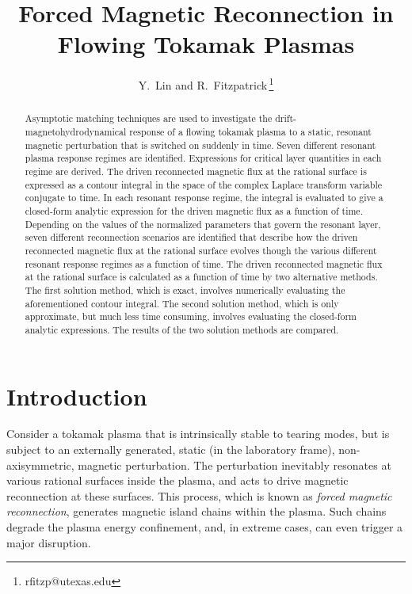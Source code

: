 \documentclass[12pt,prb,aps]{revtex4-1}
\begin{document}
\title{Forced Magnetic Reconnection in Flowing Tokamak Plasmas}
\author{Y.~Lin and R.~Fitzpatrick\,\footnote{rfitzp@utexas.edu}}

\begin{abstract}
Asymptotic matching techniques are used to investigate the drift-magnetohydrodynamical response of a flowing tokamak plasma to a static, resonant magnetic perturbation  that is switched on suddenly in time.
Seven different resonant plasma response regimes are identified. 
 Expressions for critical layer quantities in each regime are derived. 
The driven reconnected magnetic
flux at the rational surface is expressed as a contour integral in the space of the complex Laplace transform variable conjugate to time. 
In each resonant response regime, the integral is evaluated to give a closed-form analytic expression for the driven magnetic flux as a function of time. 
Depending on the values of the normalized parameters that govern the resonant layer, seven different reconnection scenarios are identified that describe how the
driven reconnected magnetic flux at the rational surface evolves though the various different resonant response regimes as a function of time. 
The driven reconnected magnetic flux at the rational surface is  calculated as a function of time  by two alternative  methods.  The first solution  method, which is exact,  involves numerically 
evaluating the aforementioned contour integral. The second solution method, which is only approximate,  but much less time consuming,  involves evaluating the closed-form analytic expressions. 
The results of the two
solution methods are compared. 
\end{abstract}

\maketitle

\section{Introduction}
Consider a  tokamak plasma that is intrinsically stable to tearing modes, but is subject to an externally generated, static (in the laboratory frame), non-axisymmetric, magnetic perturbation. The perturbation  inevitably 
resonates at various rational surfaces inside the plasma, and  acts to drive magnetic reconnection at these surfaces. This
process, which is known as {\em forced magnetic reconnection},  generates magnetic island chains within the plasma.\cite{err1,err1a}  Such chains degrade the plasma energy confinement,\cite{chang} and, in extreme cases, can even trigger a major disruption.
\end{document}

